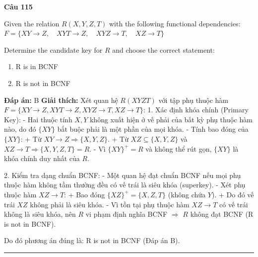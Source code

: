 \documentclass[11pt,a4paper]{article}
\newenvironment{question}[1]{%
  \par\vspace{1em}\noindent\textbf{\large Câu #1}\par\vspace{0.4em}
}{%
  \par\vspace{1em}\hrule\vspace{0.6em}
}
\newenvironment{choices}{%
  \begin{enumerate}[label=\textbf{\Alph*.},leftmargin=2.2em,itemsep=2pt,topsep=3pt]
}{%
  \end{enumerate}
}
\newcommand{\choice}{\item}
\begin{document}
\begin{question}{115}
Given the relation \(R(X, Y, Z, T)\) with the following functional dependencies:
\(F = \{ XY \rightarrow Z, \quad XYT \rightarrow Z, \quad XYZ \rightarrow T, \quad XZ \rightarrow T \}\)

Determine the candidate key for \(R\) and choose the correct statement:
\begin{choices}
\choice R is in BCNF
\choice R is not in BCNF
\end{choices}
\textbf{Đáp án:} B
\textbf{Giải thích:} Xét quan hệ $R(XYZT)$ với tập phụ thuộc hàm $F = \{XY \rightarrow Z, XYT \rightarrow Z, XYZ \rightarrow T, XZ \rightarrow T\}$:
1. Xác định khóa chính (Primary Key):
- Hai thuộc tính $X, Y$ không xuất hiện ở vế phải của bất kỳ phụ thuộc hàm nào, do đó $\{XY\}$ bắt buộc phải là một phần của mọi khóa.
- Tính bao đóng của $\{XY\}$:
  + Từ $XY \rightarrow Z \Rightarrow \{X, Y, Z\}$.
  + Từ $XZ \subseteq \{X, Y, Z\}$ và $XZ \rightarrow T \Rightarrow \{X, Y, Z, T\} = R$.
- Vì $\{XY\}^+ = R$ và không thể rút gọn, $\{XY\}$ là khóa chính duy nhất của $R$.

2. Kiểm tra dạng chuẩn BCNF:
- Một quan hệ đạt chuẩn BCNF nếu mọi phụ thuộc hàm không tầm thường đều có vế trái là siêu khóa (superkey).
- Xét phụ thuộc hàm $XZ \rightarrow T$:
  + Bao đóng $\{XZ\}^+ = \{X, Z, T\}$ (không chứa $Y$).
  + Do đó vế trái $XZ$ không phải là siêu khóa.
- Vì tồn tại phụ thuộc hàm $XZ \rightarrow T$ có vế trái không là siêu khóa, nên $R$ vi phạm định nghĩa BCNF $\Rightarrow$ $R$ không đạt BCNF (R is not in BCNF).

Do đó phương án đúng là: R is not in BCNF (Đáp án B).
\end{question}
\end{document}
